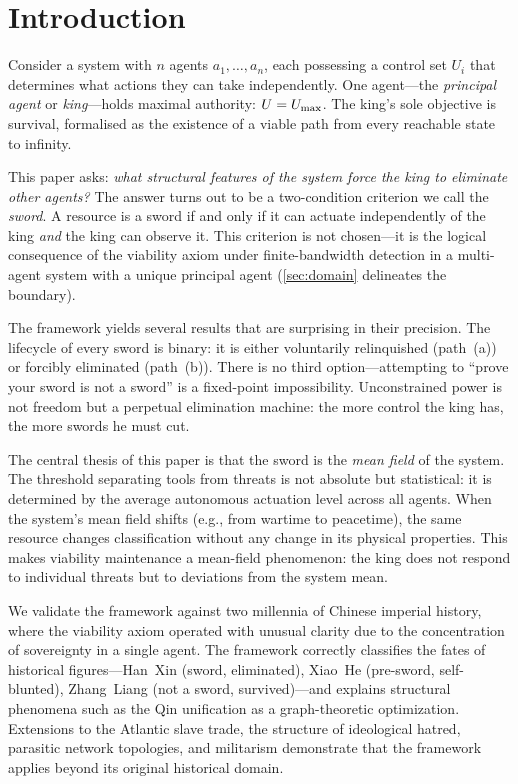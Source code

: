 \chapter{Introduction}\label{sec:intro}

Consider a system with $n$ agents $a_1, \ldots, a_n$, each possessing a
control set $U_i$ that determines what actions they can take
independently. One agent---the \emph{principal agent} or
\emph{king}---holds maximal authority: $U = U_{\max}$. The king's sole
objective is survival, formalised as the existence of a viable path from
every reachable state to infinity.

This paper asks: \emph{what structural features of the system force the
king to eliminate other agents?} The answer turns out to be a two-condition
criterion we call the \emph{sword}. A resource is a sword if and only if
it can actuate independently of the king \emph{and} the king can observe
it. This criterion is not chosen---it is the logical consequence
of the viability axiom under finite-bandwidth detection in a
multi-agent system with a unique principal agent
(\cref{sec:domain} delineates the boundary).

The framework yields several results that are surprising in their
precision. The lifecycle of every sword is binary: it is either
voluntarily relinquished (path~(a)) or forcibly eliminated (path~(b)).
There is no third option---attempting to ``prove your sword is not a
sword'' is a fixed-point impossibility. Unconstrained power is not
freedom but a perpetual elimination machine: the more control the king
has, the more swords he must cut.

The central thesis of this paper is that the sword is the
\emph{mean field} of the system. The threshold separating tools from
threats is not absolute but statistical: it is determined by the average
autonomous actuation level across all agents. When the system's mean
field shifts (e.g., from wartime to peacetime), the same resource
changes classification without any change in its physical properties.
This makes viability maintenance a mean-field phenomenon: the king does
not respond to individual threats but to deviations from the system mean.

We validate the framework against two millennia of Chinese imperial
history, where the viability axiom operated with unusual clarity due to
the concentration of sovereignty in a single agent. The framework
correctly classifies the fates of historical figures---Han~Xin (sword,
eliminated), Xiao~He (pre-sword, self-blunted), Zhang~Liang (not a sword,
survived)---and explains structural phenomena such as the Qin unification
as a graph-theoretic optimization. Extensions to the Atlantic slave trade,
the structure of ideological hatred, parasitic network topologies, and
militarism demonstrate that the framework applies beyond its original
historical domain.

